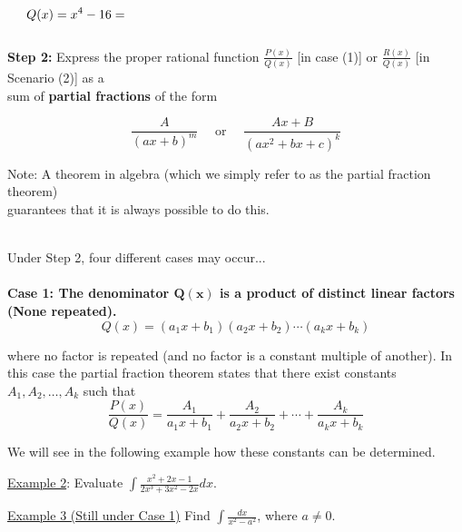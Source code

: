 \documentclass[paper=a4, fontsize=11pt]{scrartcl} %
\numberwithin{equation}{section} %
\numberwithin{figure}{section} %
\numberwithin{table}{section} %
\newcommand{\ds}{\displaystyle}
\begin{document}
\[Q(x) = x^4 - 16 = \hspace{3.5in}\]
\indent\\

\textbf{Step 2:} Express the proper rational function $\ds\frac{P(x)}{Q(x)}$ [in case (1)] or $\ds\frac{R(x)}{Q(x)}$ [in Scenario (2)] as a \\
\hspace{47pt}sum of \textbf{partial fractions} of the form

\[\ds\frac{A}{(ax+b)^{m}} \quad \text{ or } \quad \ds\frac{Ax+B}{(ax^2 + bx + c)^{k}}\]

\hspace{47pt}Note: A theorem in algebra (which we simply refer to as the partial fraction theorem) \\
\hspace{47pt} \hspace{24pt} guarantees that it is always possible to do this.\\
\indent\\
\indent


Under Step 2, four different cases may occur...\\
\indent\\

\textbf{Case 1: The denominator $\mathbf{Q(x)}$ is a product of distinct linear factors (None repeated).}\\

\[Q(x)=(a_1x+b_1)(a_2x+b_2)\cdots(a_kx+b_k)\]

where no factor is repeated (and no factor is a constant multiple of another). In this case the partial fraction theorem states that there exist constants $A_1,A_2,\ldots,A_k$ such that\\

\[\ds\frac{P(x)}{Q(x)} = \ds\frac{A_1}{a_1x+b_1} + \ds\frac{A_2}{a_2x+b_2} + \cdots + \ds\frac{A_k}{a_kx + b_k}\]

We will see in the following example how these constants can be determined.\\
\indent

\underline{Example 2}: Evaluate $\ds\int \ds\frac{x^2 + 2x-1}{2x^3+3x^2-2x}dx$.\\
\indent

\newpage

\underline{Example 3 (Still under Case 1)} Find $\ds\int \ds\frac{dx}{x^2 - a^2}$, where $a\neq 0$.\\
\indent

\vspace{3.5in}
\end{document}
